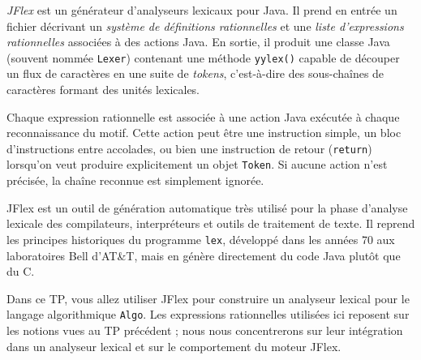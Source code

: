 \documentclass{td}
\begin{document}



\emph{JFlex} est un générateur d'analyseurs lexicaux pour Java.
Il prend en entrée un fichier décrivant un \emph{système de définitions rationnelles}
et une \emph{liste d'expressions rationnelles} associées à des actions Java.
En sortie, il produit une classe Java (souvent nommée \texttt{Lexer})
contenant une méthode \texttt{yylex()} capable de découper un flux de caractères
en une suite de \emph{tokens}, c'est-à-dire des sous-chaînes de caractères formant des unités lexicales.

Chaque expression rationnelle est associée à une action Java exécutée à chaque reconnaissance du motif.
Cette action peut être une instruction simple, un bloc d'instructions entre accolades,
ou bien une instruction de retour (\texttt{return}) lorsqu'on veut produire explicitement un objet \texttt{Token}.
Si aucune action n'est précisée, la chaîne reconnue est simplement ignorée.

JFlex est un outil de génération automatique très utilisé pour la phase d'analyse lexicale des compilateurs,
interpréteurs et outils de traitement de texte. Il reprend les principes historiques du programme \texttt{lex},
développé dans les années 70 aux laboratoires Bell d'AT\&T, mais en génère directement du code Java plutôt que du C.

Dans ce TP, vous allez utiliser JFlex pour construire un analyseur lexical
pour le langage algorithmique \texttt{Algo}.
Les expressions rationnelles utilisées ici reposent sur les notions vues
au TP précédent ; nous nous concentrerons sur leur intégration
dans un analyseur lexical et sur le comportement du moteur JFlex.
\end{document}
